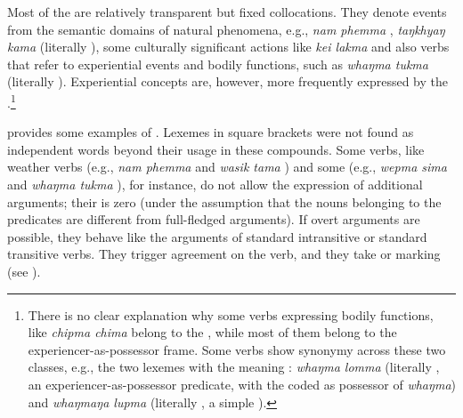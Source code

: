 Most of the  are relatively transparent but fixed collocations. They denote events from the semantic domains of natural phenomena, e.g., \emph{nam phemma} , \emph{taŋkhyaŋ kama}  (literally ), some culturally significant actions like \emph{kei lakma}  and also verbs that refer to experiential events and bodily functions, such as \emph{whaŋma tukma}  (literally ). Experiential concepts are, however, more frequently expressed by the .\footnote{There is no clear explanation why some verbs expressing bodily functions, like  \emph{chipma chima}   belong to the , while most of them belong to the experiencer-as-possessor frame. Some verbs show  synonymy across these two classes, e.g., the two lexemes with the meaning  : \emph{whaŋma lomma} (literally , an experiencer-as-possessor predicate, with the  coded as possessor of \emph{whaŋma}) and \emph{whaŋmaŋa lupma} (literally , a simple ).} 

 provides some examples of . Lexemes in square brackets were not found as independent words beyond their usage in these compounds. Some verbs, like weather verbs (e.g., \emph{nam phemma}  and \emph{wasik tama} ) and some  (e.g., \emph{wepma sima}  and \emph{whaŋma tukma} ), for instance, do not allow the expression of additional arguments; their  is zero (under the assumption that the nouns belonging to the predicates are different from full-fledged arguments). If overt arguments are possible, they behave like the arguments of standard intransitive or standard transitive verbs. They trigger agreement on the verb, and they take  or   marking (see ). 

